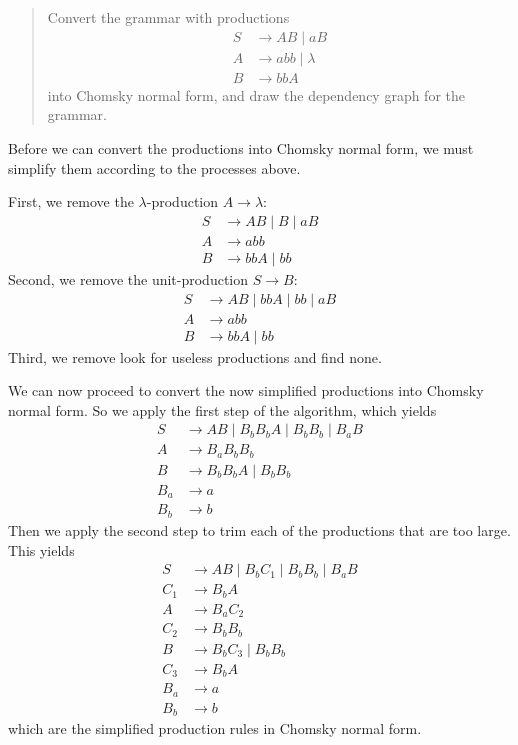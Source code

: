\documentclass{article}
\begin{document}
\section{}
\begin{quote}
    Convert the grammar with productions
    \begin{align*}
        S & \to AB \mid aB       \\
        A & \to abb \mid \lambda \\
        B & \to bbA
    \end{align*}
    into Chomsky normal form, and draw the dependency graph for the grammar.
\end{quote}

Before we can convert the productions into Chomsky normal form, we must simplify them according to the processes above.

First, we remove the $\lambda$-production $A \to \lambda$:
\begin{align*}
    S & \to AB \mid B \mid aB \\
    A & \to abb               \\
    B & \to bbA \mid bb
\end{align*}
Second, we remove the unit-production $S \to B$:
\begin{align*}
    S & \to AB \mid bbA \mid bb \mid aB \\
    A & \to abb                         \\
    B & \to bbA \mid bb
\end{align*}
Third, we remove look for useless productions and find none.

We can now proceed to convert the now simplified productions into Chomsky normal form.
So we apply the first step of the algorithm, which yields
\begin{align*}
    S   & \to AB \mid B_b B_b A \mid B_b B_b \mid B_a B \\
    A   & \to B_a B_b B_b                               \\
    B   & \to B_b B_b A \mid B_b B_b                    \\
    B_a & \to a                                         \\
    B_b & \to b
\end{align*}
Then we apply the second step to trim each of the productions that are too large.
This yields
\begin{align*}
    S   & \to AB \mid B_b C_1 \mid B_b B_b \mid B_a B \\
    C_1 & \to B_b A                                   \\
    A   & \to B_a C_2                                 \\
    C_2 & \to B_b B_b                                 \\
    B   & \to B_b C_3 \mid B_b B_b                    \\
    C_3 & \to B_b A                                   \\
    B_a & \to a                                       \\
    B_b & \to b
\end{align*}
which are the simplified production rules in Chomsky normal form.
\end{document}
